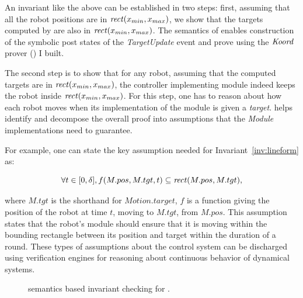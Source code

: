 An invariant like the above can be established in two steps:
first, assuming that all the robot positions are in $\mathit{rect}(x_{min}, x_{max})$,
we show that the targets computed by \LineForm are also in $\mathit{rect}(x_{min}, x_{max})$.
The \K semantics of \lgname enables construction of the symbolic post states of the \emph{TargetUpdate} event
and prove  using the $\emph{Koord}$ prover () I built. 

The second step is to show that for any robot, assuming that the computed targets are in $\mathit{rect}(x_{min}, x_{max})$,
the controller implementing \Motion module indeed keeps the robot inside $\mathit{rect}(x_{min}, x_{max})$.
%
For this step, one has to reason about how each robot moves when its implementation of the \Motion module is given a \emph{target}.
\lgname helps identify and decompose the overall proof into assumptions that the \emph{Module} implementations need to guarantee.

For example, one can state the key assumption needed for Invariant~\ref{inv:lineform} as:
\begin{assumption}
\label{lineform-assume}
\[
\forall t \in [0, \delta], f(M.pos, M.tgt, t) \subseteq \mathit{rect}(M.pos, M.tgt),
\]
\end{assumption}
\noindent
where $M.tgt$ is the shorthand for $Motion.target$,
$f$ is a function giving the position of the robot at time $t$, moving to $M.tgt$, from $M.pos$.
This assumption states that the robot's \Motion module should ensure that it is moving within the bounding rectangle between its position and target within the duration of a round.
These types of assumptions about the control system can be discharged using verification engines for reasoning about continuous behavior of dynamical systems.

\begin{figure}
\centering
{}
\caption{\small \K semantics based invariant checking for \lgname.}
\label{fig:tools}
\end{figure}
